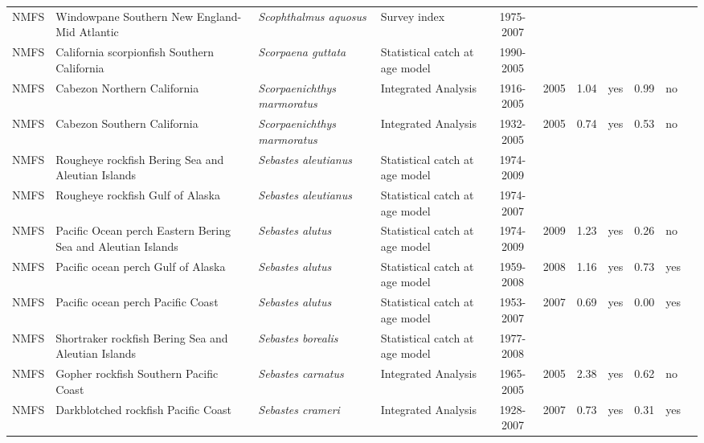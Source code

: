 \begin{longtable}{p{1.8cm}p{3.5cm}p{3.5cm}p{3cm}cccp{0.9cm}cp{0.9cm}c}
  NMFS & Windowpane Southern New England-Mid Atlantic & \textit{Scophthalmus aquosus} & Survey index & 1975-2007 &  &  &  &  &  & \cite{http://www.nefsc.noaa.gov/nefsc/publications/crd/crd0815/crd0815.pdf} \\ 
  NMFS & California scorpionfish Southern California & \textit{Scorpaena guttata} & Statistical catch at age model & 1990-2005 &  &  &  &  &  & \cite{Scorpionfish_assessment_report_2005.pdf} \\ 
  NMFS & Cabezon Northern California & \textit{Scorpaenichthys marmoratus} & Integrated Analysis & 1916-2005 & 2005 & 1.04 & yes & 0.99 & no & \cite{2005-SAFE-WCcabezon.pdf} \\ 
  NMFS & Cabezon Southern California & \textit{Scorpaenichthys marmoratus} & Integrated Analysis & 1932-2005 & 2005 & 0.74 & yes & 0.53 & no & \cite{2005_SAFE_Wccabezon.pdf} \\ 
  NMFS & Rougheye rockfish Bering Sea and Aleutian Islands & \textit{Sebastes aleutianus} & Statistical catch at age model & 1974-2009 &  &  &  &  &  & \cite{2008 SAFE BSAIrougheye.pdf} \\ 
  NMFS & Rougheye rockfish Gulf of Alaska & \textit{Sebastes aleutianus} & Statistical catch at age model & 1974-2007 &  &  &  &  &  & \cite{AFSC-RYEROCKGA-2008-Rougheye rockfish GA.pdf} \\ 
  NMFS & Pacific Ocean perch Eastern Bering Sea and Aleutian Islands & \textit{Sebastes alutus} & Statistical catch at age model & 1974-2009 & 2009 & 1.23 & yes & 0.26 & no & \cite{2008_SAFE_BSAIpop.pdf} \\ 
  NMFS & Pacific ocean perch Gulf of Alaska & \textit{Sebastes alutus} & Statistical catch at age model & 1959-2008 & 2008 & 1.16 & yes & 0.73 & yes & \cite{AFSC-POPERCHGA-2008-Pacific ocean perch GA.pdf} \\ 
  NMFS & Pacific ocean perch Pacific Coast & \textit{Sebastes alutus} & Statistical catch at age model & 1953-2007 & 2007 & 0.69 & yes & 0.00 & yes & \cite{NWFSC-POPERCHPCOAST-2007-Pacific ocean perch.pdf} \\ 
  NMFS & Shortraker rockfish Bering Sea and Aleutian Islands & \textit{Sebastes borealis} & Statistical catch at age model & 1977-2008 &  &  &  &  &  & \cite{2008_SAFE_BSAIshortraker.pdf} \\ 
  NMFS & Gopher rockfish Southern Pacific Coast & \textit{Sebastes carnatus} & Integrated Analysis & 1965-2005 & 2005 & 2.38 & yes & 0.62 & no & \cite{2005-SAFE-Wcgopher.pdf} \\ 
  NMFS & Darkblotched rockfish Pacific Coast & \textit{Sebastes crameri} & Integrated Analysis & 1928-2007 & 2007 & 0.73 & yes & 0.31 & yes & \cite{NWFSC-DKROCKPCOAST-2008-Darkblotched rockfish.pdf} \\ 

\end{longtable}
